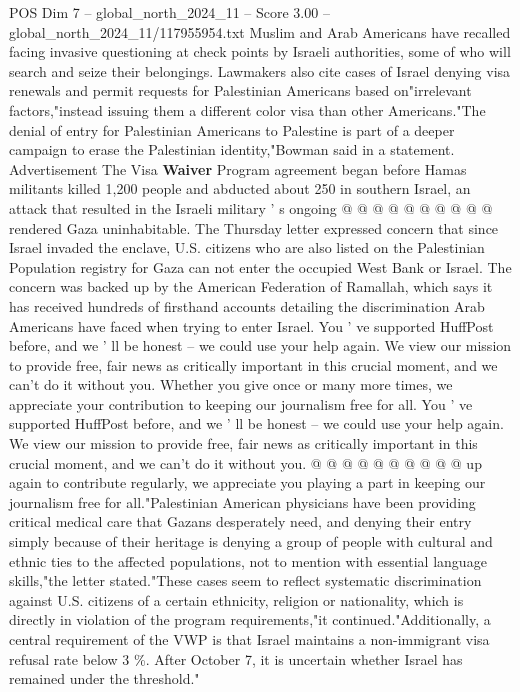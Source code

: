 \begin{textsample}{POS Dim 7 – global\_north\_2024\_11 – Score 3.00 – global\_north\_2024\_11/117955954.txt}
Muslim and Arab Americans have recalled facing invasive questioning at check points by Israeli authorities, some of who will search and seize their belongings.
Lawmakers also cite cases of Israel denying visa renewals and permit requests for Palestinian Americans based on"irrelevant factors,"instead issuing them a different color visa than other Americans."The denial of entry for Palestinian Americans to Palestine is part of a deeper campaign to erase the Palestinian identity,"Bowman said in a statement.
Advertisement The Visa \textbf{Waiver} Program agreement began before Hamas militants killed 1,200 people and abducted about 250 in southern Israel, an attack that resulted in the Israeli military ' s ongoing @ @ @ @ @ @ @ @ @ @ rendered Gaza uninhabitable.
The Thursday letter expressed concern that since Israel invaded the enclave, U.S. citizens who are also listed on the Palestinian Population registry for Gaza can not enter the occupied West Bank or Israel.
The concern was backed up by the American Federation of Ramallah, which says it has received hundreds of firsthand accounts detailing the discrimination Arab Americans have faced when trying to enter Israel.
You ' ve supported HuffPost before, and we ' ll be honest -- we could use your help again.
We view our mission to provide free, fair news as critically important in this crucial moment, and we can't do it without you.
Whether you give once or many more times, we appreciate your contribution to keeping our journalism free for all.
You ' ve supported HuffPost before, and we ' ll be honest -- we could use your help again.
We view our mission to provide free, fair news as critically important in this crucial moment, and we can't do it without you. @ @ @ @ @ @ @ @ @ @ up again to contribute regularly, we appreciate you playing a part in keeping our journalism free for all."Palestinian American physicians have been providing critical medical care that Gazans desperately need, and denying their entry simply because of their heritage is denying a group of people with cultural and ethnic ties to the affected populations, not to mention with essential language skills,"the letter stated."These cases seem to reflect systematic discrimination against U.S. citizens of a certain ethnicity, religion or nationality, which is directly in violation of the program requirements,"it continued."Additionally, a central requirement of the VWP is that Israel maintains a non-immigrant visa refusal rate below 3 \%.
After October 7, it is uncertain whether Israel has remained under the threshold."

\end{textsample}
